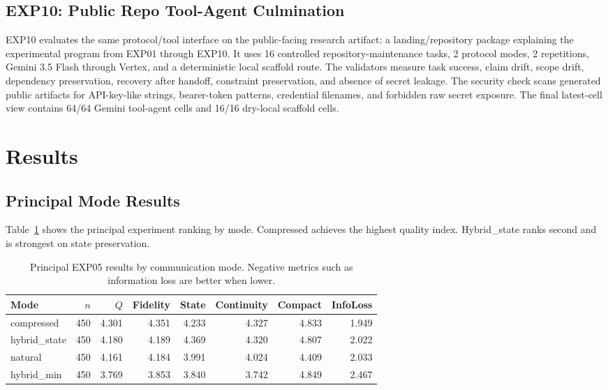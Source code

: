 \documentclass[11pt]{article}
\begin{document}
\subsection{EXP10: Public Repo Tool-Agent Culmination}
EXP10 evaluates the same protocol/tool interface on the public-facing research artifact: a landing/repository package explaining the experimental program from EXP01 through EXP10. It uses 16 controlled repository-maintenance tasks, 2 protocol modes, 2 repetitions, Gemini 3.5 Flash through Vertex, and a deterministic local scaffold route. The validators measure task success, claim drift, scope drift, dependency preservation, recovery after handoff, constraint preservation, and absence of secret leakage. The security check scans generated public artifacts for API-key-like strings, bearer-token patterns, credential filenames, and forbidden raw secret exposure. The final latest-cell view contains 64/64 Gemini tool-agent cells and 16/16 dry-local scaffold cells.

\section{Results}
\subsection{Principal Mode Results}
Table~\ref{tab:principal_modes} shows the principal experiment ranking by mode. Compressed achieves the highest quality index. Hybrid\_state ranks second and is strongest on state preservation.

\begin{table}[ht]
\centering
\small
\begin{tabular}{lrrrrrrr}
\toprule
Mode & $n$ & $Q$ & Fidelity & State & Continuity & Compact & InfoLoss \\
\midrule
compressed & 450 & 4.301 & 4.351 & 4.233 & 4.327 & 4.833 & 1.949 \\
hybrid\_state & 450 & 4.180 & 4.189 & 4.369 & 4.320 & 4.807 & 2.022 \\
natural & 450 & 4.161 & 4.184 & 3.991 & 4.024 & 4.409 & 2.033 \\
hybrid\_min & 450 & 3.769 & 3.853 & 3.840 & 3.742 & 4.849 & 2.467 \\
\bottomrule
\end{tabular}
\caption{Principal EXP05 results by communication mode. Negative metrics such as information loss are better when lower.}
\label{tab:principal_modes}
\end{table}
\end{document}
